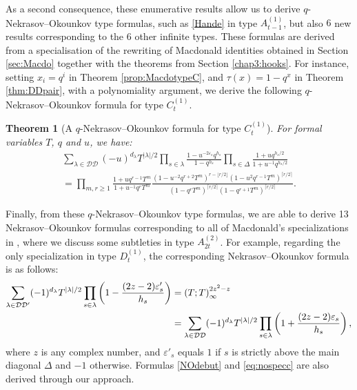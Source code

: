 \documentclass[11pt,letterpaper]{amsart}
\def\ccdd{\mathcal {DD}}
\newtheorem{thm}[df]{Theorem}
\numberwithin{equation}{section}
\numberwithin{df}{section}
\begin{document}
%
As a second consequence, these enumerative results allow us to derive $q$-Nekrasov--Okounkov type formulas, such as \eqref{Hande} in type $A^{(1)}_{t-1}$, but also $6$ new results corresponding to the $6$ other infinite types. These formulas are derived from a specialisation of the rewriting of Macdonald identities obtained in Section \ref{sec:Macdo} together with the theorems from Section \ref{chap3:hooks}. For instance, setting $x_i=q^i$ in Theorem \ref{prop:MacdotypeC}, and $\tau(x)=1-q^x$ in Theorem \ref{thm:DDpair}, with a polynomiality argument, we derive the following $q$-Nekrasov--Okounkov formula for type $C^{(1)}_{t}$.
\begin{thm}[A $q$-Nekrasov--Okounkov formula for type $C^{(1)}_t$] \label{NOC}
For formal variables $T$, $q$ and $u$, we have:
\begin{multline}
\sum_{\lambda\in\ccdd} (-u)^{d_\lambda}T^{\lvert \lambda\rvert/2}\prod_{s\in\lambda}\frac{1-u^{-2\varepsilon_s}q^{h_s}}{1-q^{h_s}}\prod_{s\in\Delta}\frac{1+uq^{h_s/2}}{1+u^{-1}q^{h_s/2}}\\=
\prod_{m,r\geq 1}\frac{1+uq^{r-1}T^m}{1+u^{-1}q^{r}T^m}\frac{\left(1-u^{-2}q^{r+2}T^m\right)^{r-\lfloor r/2\rfloor}\left(1-u^2q^{r-1}T^m\right)^{\lceil r/2 \rceil}}{\left(1-q^{r}T^m\right)^{\lceil r/2 \rceil}\left(1-q^{r+1}T^m\right)^{\lceil r/2 \rceil}}.\label{eq:noc}
\end{multline}
\end{thm}

Finally, from these $q$-Nekrasov--Okounkov type formulas, we are able to derive 13 Nekrasov--Okounkov formulas corresponding to all of Macdonald's specializations in \cite[Appendix $1$]{Mac}, where we discuss some subtleties in type $A^{(2)}_{2t}$. For example, regarding the only specialization in type $D^{(1)}_t$, the corresponding Nekrasov--Okounkov formula is as follows:
\begin{align}\label{eq:nospecd}
\sum_{\lambda\in\ccdd'}(-1)^{d_\lambda}T^{\lvert \lambda\rvert/2}\prod_{s\in\lambda}\left(1-\frac{(2z-2)\varepsilon'_s}{h_s}\right)&=\left(T;T\right)_{\infty}^{2z^2-z}\\
&=\sum_{\lambda\in\ccdd}(-1)^{d_\lambda}T^{\lvert \lambda\rvert/2}\prod_{s\in\lambda}\left(1+\frac{(2z-2)\varepsilon_s}{h_s}\right),\notag
\end{align}
where $z$ is any complex number, and $\varepsilon'_s$ equals $1$ if $s$ is strictly above the main diagonal $\Delta$ and $-1$ otherwise. Formulas \eqref{NOdebut} and \eqref{eq:nospecc} are also derived through our approach.
\end{document}

